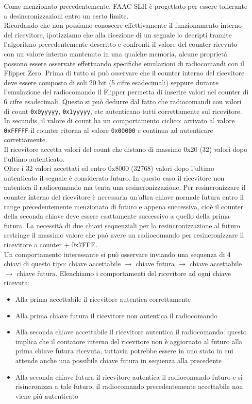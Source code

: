 Come menzionato precedentemente, FAAC SLH è progettato per essere tollerante a desincronizzazioni entro un certo limite.\\
Ricordando che non possiamo conoscere effettivamente il funzionamento interno del ricevitore, ipotizziamo che alla ricezione di un segnale lo decripti tramite l’algoritmo precedentemente descritto e confronti il valore del counter ricevuto con un valore interno mantenuto in una qualche memoria, alcune proprietà possono essere osservate effettuando specifiche emulazioni di radiocomandi con il Flipper Zero.
Prima di tutto si può osservare che il counter interno del ricevitore deve essere composto di soli 20 bit (5 cifre esadecimali) seppure durante l’emulazione del radiocomando il Flipper permetta di inserire valori nel counter di 6 cifre esadecimali. Questo si può dedurre dal fatto che radiocomandi con valori di count \texttt{0x0yyyyy}, \texttt{0x1yyyyy}, etc autenticano tutti correttamente sul ricevitore.\\
In secundis, il valore di count ha un comportamento ciclico: arrivato al valore \texttt{0xFFFFF} il counter ritorna al valore \texttt{0x00000} e continua ad autenticare correttamente.\\
Il ricevitore accetta valori del count che distano di massimo 0x20 (32) valori dopo l’ultimo autenticato.\\
Oltre i 32 valori accettati ed entro 0x8000 (32768) valori dopo l’ultimo autenticato il segnale è considerato futuro. In questo caso il ricevitore non autentica il radiocomando ma tenta una resincronizzazione. Per resincronizzare il counter interno del ricevitore è necessaria un’altra chiave normale futura entro il range precedentemente menzionato di futuro e appena successiva, cioè il counter della seconda chiave deve essere esattamente successivo a quello della prima futura. La necessità di due chiavi sequenziali per la resincronizzazione al futuro restringe il massimo valore che può avere un radiocomando per resincronizzare il ricevitore a counter + 0x7FFF.\\
Un comportamento interessante si può osservare inviando una sequenza di 4 chiavi di questo tipo: chiave accettabile \(\rightarrow\) chiave futura \(\rightarrow\) chiave accettabile \(\rightarrow\) chiave futura. Elenchiamo i comportamenti del ricevitore ad ogni chiave ricevuta:
\begin{itemize}
  \item Alla prima accettabile il ricevitore autentica correttamente
  \item Alla prima chiave futura il ricevitore non autentica il radiocomando
  \item Alla seconda chiave accettabile il ricevitore autentica il radiocomando: questo implica che il contatore interno del ricevitore non è aggiornato al futuro alla prima chiave futura ricevuta, tuttavia potrebbe essere in uno stato in cui attende anche una possibile chiave futura in sequenza alla precedente
  \item Alla seconda chiave futura il ricevitore autentica il radiocomando futuro e si risincronizza a tale futuro, il radiocomando precedentemente accettabile non viene più autenticato
\end{itemize}
